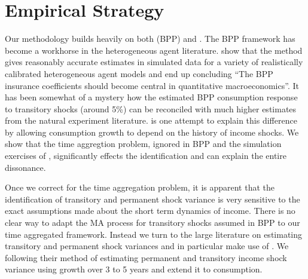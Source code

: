 \documentclass[titlepage]{\econtex}\newcommand{\texname}{IncomeUncertainty}
\begin{document}
\section{Empirical Strategy} \label{empirical_strategy}
Our methodology builds heavily on both \cite{blundell_consumption_2008} (BPP) and \cite{carroll_nature_1997}. The BPP framework has become a workhorse in the heterogeneous agent literature. \cite{kaplan_how_2010} show that the method gives reasonably accurate estimates in simulated data for a variety of realistically calibrated heterogeneous agent models and end up concluding ``The BPP insurance coefficients should become central in quantitative macroeconomics''. It has been somewhat of a mystery how the estimated BPP consumption response to transitory shocks (around 5\%) can be reconciled with much higher estimates from the natural experiment literature. \cite{commault_how_2017} is one attempt to explain this difference by allowing consumption growth to depend on the history of income shocks. We show that the time aggregtion problem, ignored in BPP and the simulation exercises of \cite{kaplan_how_2010}, significantly effects the identification and can explain the entire dissonance.

Once we correct for the time aggregation problem, it is apparent that the identification of transitory and permanent shock variance is very sensitive to the exact assumptions made about the short term dynamics of income. There is no clear way to adapt the MA process for transitory shocks assumed in BPP to our time aggregated framework. Instead we turn to the large literature on estimating transitory and permanent shock variances and in particular make use of \cite{carroll_nature_1997}. We following their method of estimating permanent and transitory income shock variance using growth over 3 to 5 years and extend it to consumption.
\end{document}
